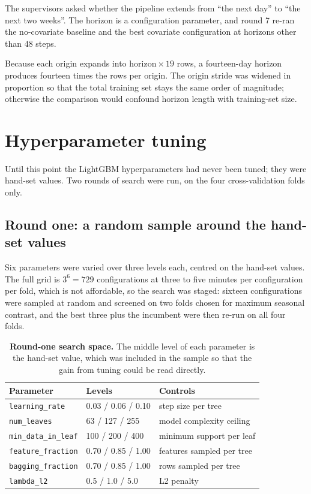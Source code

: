 The supervisors asked whether the pipeline extends from ``the next day'' to ``the next two
weeks''. The horizon is a configuration parameter, and round 7 re-ran the no-covariate
baseline and the best covariate configuration at horizons other than 48 steps.

Because each origin expands into $\mathrm{horizon} \times 19$ rows, a fourteen-day horizon
produces fourteen times the rows per origin. The origin stride was widened in proportion
so that the total training set stays the same order of magnitude; otherwise the comparison
would confound horizon length with training-set size.

\section{Hyperparameter tuning}
\label{sec:exp-tuning}

Until this point the LightGBM hyperparameters had never been tuned; they were hand-set
values. Two rounds of search were run, on the four cross-validation folds only.

\subsection{Round one: a random sample around the hand-set values}

Six parameters were varied over three levels each, centred on the hand-set values. The
full grid is $3^6 = 729$ configurations at three to five minutes per configuration per
fold, which is not affordable, so the search was staged: sixteen configurations were
sampled at random and screened on two folds chosen for maximum seasonal contrast, and the
best three plus the incumbent were then re-run on all four folds.

\begin{table}[htp]
\centering
\begin{tabular}{lll}
\toprule
{\bf Parameter} & {\bf Levels} & {\bf Controls} \\
\midrule
\verb+learning_rate+ & 0.03 / 0.06 / 0.10 & step size per tree \\
\verb+num_leaves+ & 63 / 127 / 255 & model complexity ceiling \\
\verb+min_data_in_leaf+ & 100 / 200 / 400 & minimum support per leaf \\
\verb+feature_fraction+ & 0.70 / 0.85 / 1.00 & features sampled per tree \\
\verb+bagging_fraction+ & 0.70 / 0.85 / 1.00 & rows sampled per tree \\
\verb+lambda_l2+ & 0.5 / 1.0 / 5.0 & L2 penalty \\
\bottomrule
\end{tabular}
\caption[Search space, round one]{\textbf{Round-one search space.} The middle level of
each parameter is the hand-set value, which was included in the sample so that the gain
from tuning could be read directly.}
\label{tab:space1}
\end{table}

